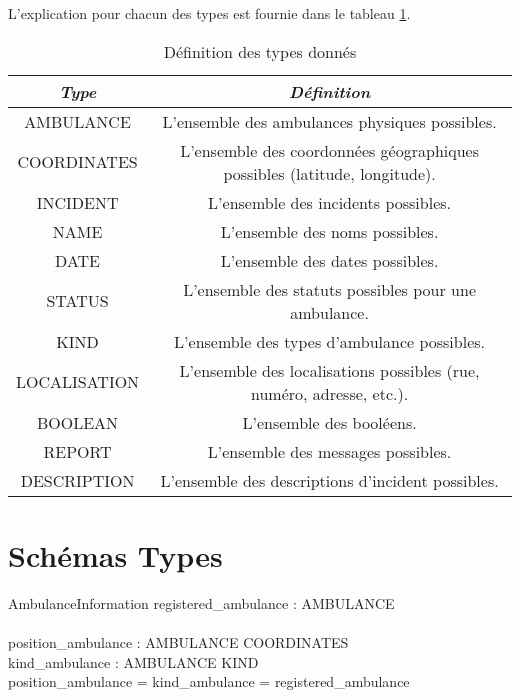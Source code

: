 \documentclass[12pt]{article}
\begin{document}
L'explication pour chacun des types est fournie dans le tableau \ref{tab:typedefinition}.
\begin{table}[htdp]
\begin{center}\begin{tabular}{|c|c|}
	\hline 
	\textit{Type} & \textit{Définition} \\
	\hline
	AMBULANCE & L'ensemble des ambulances physiques possibles. \\
	\hline
	COORDINATES & L'ensemble des coordonnées géographiques possibles (latitude, longitude). \\
	\hline
	INCIDENT & L'ensemble des incidents possibles. \\
	\hline
	NAME & L'ensemble des noms possibles. \\ %
	\hline
	DATE & L'ensemble des dates possibles. \\ %
	\hline
	STATUS & L'ensemble des statuts possibles pour une ambulance. \\
	\hline
	KIND & L'ensemble des types d'ambulance possibles. \\
	\hline
	LOCALISATION & L'ensemble des localisations possibles (rue, numéro, adresse, etc.). \\
	\hline
	BOOLEAN & L'ensemble des booléens. \\
	\hline
	REPORT & L'ensemble des messages possibles. \\
	\hline
	DESCRIPTION & L'ensemble des descriptions d'incident possibles. \\
	\hline
\end{tabular}
\caption{Définition des types donnés}
\end{center}
\label{tab:typedefinition}
\end{table}


\section{Schémas Types}
\begin{schema}{AmbulanceInformation}
 	registered\_ambulance : \power AMBULANCE \\
	\newline \\
 	position\_ambulance : AMBULANCE \pinj COORDINATES \\
 	kind\_ambulance : AMBULANCE \pfun KIND \\
  \where
  	\dom position\_ambulance = \dom kind\_ambulance = registered\_ambulance
\end{schema}
\end{document}
